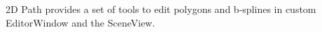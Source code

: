 2D Path provides a set of tools to edit polygons and b-\/splines in custom Editor\+Window and the Scene\+View. 